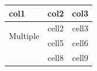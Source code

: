 \documentclass[10pt,a4paper]{article}
\begin{document}
\begin{tabular}{|l|c|c|}
    \hline
    \hspace{10pt}col1 & col2 & col3 \\
    \hline
    \multirow{2}{*}{Multiple } & cell2 & cell3 \\
    \multirow{2}{*}{row}& cell5 & cell6 \\
    & cell8 & cell9 \\
    \hline
\end{tabular}
\end{document}
